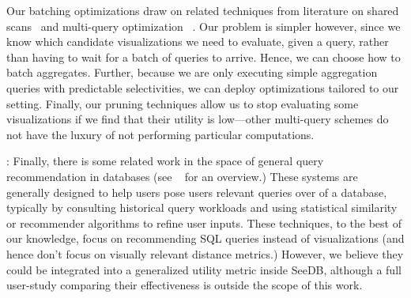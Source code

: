  Our batching optimizations
draw on
related techniques from literature on shared
scans~\cite{Fernandez:1994:RBW:191843.191947} and multi-query
optimization
~\cite{DBLP:journals/tods/Sellis88,DBLP:journals/pvldb/KementsietsidisNCV08,DBLP:journals/pvldb/WangC13}.
Our problem is simpler however, since we know which candidate
visualizations we need to evaluate, given a query, rather than having
to wait for a batch of queries to arrive.  Hence, we can choose how to
batch aggregates.  Further, because we are only executing simple
aggregation queries with predictable selectivities, we can deploy
optimizations tailored to our setting.  Finally, our pruning
techniques allow us to stop evaluating some visualizations if we find
that their utility is low---other multi-query schemes do not have the
luxury of not performing particular computations.

: Finally, there is some related work in
the space of general query recommendation in databases (see
~\cite{marcel2011survey} for an overview.)  These systems are
generally designed to help users pose users relevant
queries over of a database, typically by consulting historical query
workloads and using statistical similarity or recommender algorithms
to refine user inputs.  These techniques, to the best of our
knowledge, focus on recommending SQL queries instead of visualizations
(and hence don't focus on visually relevant distance metrics.)  However, we
believe they could be integrated into a generalized utility metric
inside SeeDB, although a full user-study comparing their effectiveness
is outside the scope of this work.







